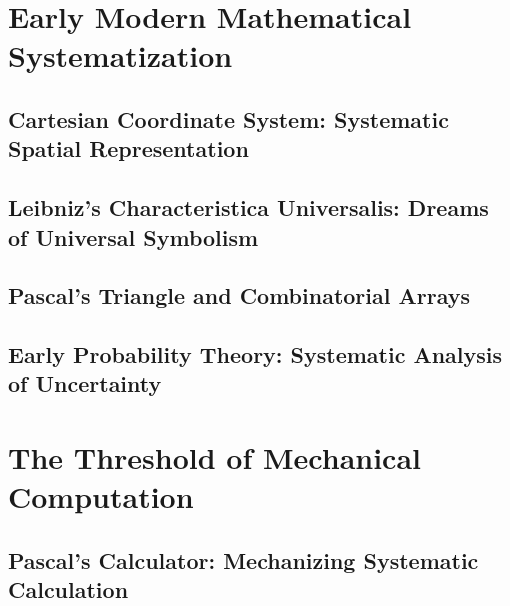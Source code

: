 \documentclass[12pt, oneside, openany]{book}
\begin{document}

\chapter{Early Modern Mathematical Systematization}

\section{Cartesian Coordinate System: Systematic Spatial Representation}

\section{Leibniz's Characteristica Universalis: Dreams of Universal Symbolism}

\section{Pascal's Triangle and Combinatorial Arrays}

\section{Early Probability Theory: Systematic Analysis of Uncertainty}


\chapter{The Threshold of Mechanical Computation}

\section{Pascal's Calculator: Mechanizing Systematic Calculation}
\end{document}
